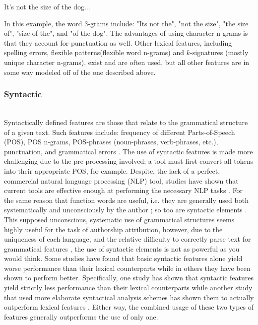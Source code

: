 \documentclass[pageno]{jpaper}
\begin{document}
\begin{center} It's not the size of the dog...\end{center}
In this example, the word 3-grams include: 
"Its not the", "not the size", "the size of", "size of the", and "of the dog".
The advantages of using character n-grams is that they account for punctuation as well.
Other lexical features, including spelling errors, flexible patterns(flexible word n-grams) and $k$-signatures (mostly unique character n-grams), exist and are often used, but all other features are in some way modeled off of the one described above.  

\subsubsection{Syntactic}
\label{sec:syntactic}
\indent \\
Syntactically defined features are those that relate to the grammatical structure of a given text.  Such features include: frequency of different Parts-of-Speech (POS), POS n-grams, POS-phrases (noun-phrases, verb-phrases, etc.), punctuation, and grammatical errors \cite{Syntactic-authorship} \cite{survey}.  The use of syntactic features is made more challenging due to the pre-processing involved; a tool must first convert all tokens into their appropriate POS, for example.  Despite, the lack of a perfect, commercial natural language processing (NLP) tool, studies have shown that current tools are effective enough at performing the necessary NLP tasks \cite{Syntactic-authorship}. For the same reason that function words are useful, i.e. they are generally used both systematically and unconsciously by the author \cite{Argamon05measuringthe}; so too are syntactic elements  \cite{survey}.  This supposed unconscious, systematic use of grammatical structures seems highly useful for the task of authorship attribution, however, due to the uniqueness of each language, and the relative difficulty to correctly parse text for grammatical features \cite{survey}, the use of syntactic elements is not as powerful as you would think.  Some studies have found that basic syntactic features alone yield worse performance than their lexical counterparts while in others they have been shown to perform better.  Specifically, one study has shown that syntactic features yield strictly less performance than their lexical counterparts \cite{DBLP:conf/coling/Gamon04} while another study that used more elaborate syntactical analysis schemes has shown them to actually outperform lexical features \cite{Syntactic-authorship}.  Either way, the combined usage of these two types of features generally outperforms the use of only one.
\end{document}
